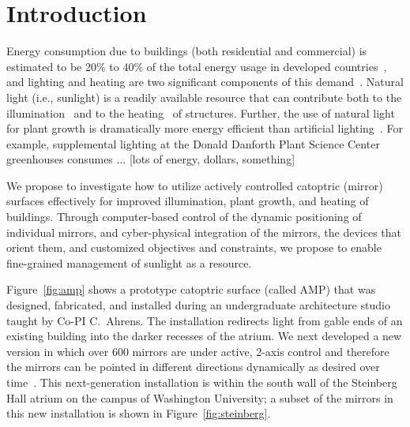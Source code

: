 \section{Introduction}
\label{sec:intro}


Energy consumption due to buildings (both residential and commercial)
is estimated to be 20\% to 40\% of the total energy usage in
developed countries~\cite{pop08}, and
lighting and heating are two significant components of this demand~\cite{keh05}.
Natural light (i.e., sunlight) is a readily available resource that
can contribute both to the illumination~\cite{Leslie03}
and to the heating~\cite{Lunde80} of structures.
Further, the use of natural light for plant growth is dramatically more
energy efficient than artificial lighting~\cite{Bugbee16}. 
For example, supplemental lighting at the Donald Danforth Plant Science Center
greenhouses consumes ... [lots of energy, dollars, something] 

We propose to investigate how to utilize actively
controlled catoptric (mirror) surfaces effectively for improved illumination,
plant growth, and heating of buildings.  Through computer-based control of
the dynamic positioning of
individual mirrors, and cyber-physical integration of the mirrors,
the devices
that orient them, and customized objectives and
constraints,
we propose to enable fine-grained management of sunlight as a resource.

Figure~\ref{fig:amp} shows a prototype catoptric surface (called AMP) that was 
designed, fabricated, and installed during an undergraduate architecture studio 
taught by Co-PI C.~Ahrens. The installation redirects light from gable ends of an 
existing building into the darker recesses of the atrium.
We next developed a
new version in which over 600 mirrors are under 
active, 2-axis control and therefore the mirrors
can be pointed in different directions dynamically as desired over
time~\cite{acmbg19,acmb18,cagm18}. 
This next-generation installation is within 
the south wall of the Steinberg Hall atrium on the campus of 
Washington University; a subset of the mirrors in this new
installation is shown in Figure~\ref{fig:steinberg}.

